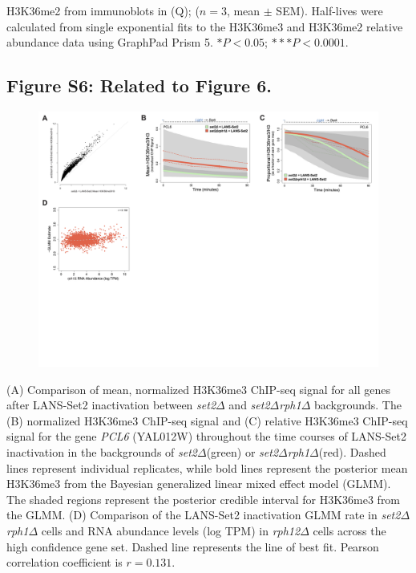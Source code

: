 \documentclass[11pt]{biorxiv}
\newcommand{\setdelt}{\emph{set2$\Delta$}\xspace}
\newcommand{\rphdelt}{\emph{rph12$\Delta$}\xspace}
\newcommand{\setdeltrphdelt}{\emph{set2$\Delta$rph1$\Delta$}\xspace}
\begin{document}
H3K36me2 from immunoblots in (Q); ($n = 3$, mean $\pm$ SEM). Half-lives were calculated from single exponential fits to the H3K36me3 and H3K36me2 relative abundance data using GraphPad Prism 5. $*P < 0.05$; $***P < 0.0001$.

\clearpage

\subsection{Figure S6: Related to Figure 6.}
\begin{figure}[ht!]
\center
\includegraphics[width=\textwidth, trim={0in 0in 0in 0in}, clip]{figures/FigS6.png}
\end{figure}
\vspace*{-1.5in}
\noindent (A) Comparison of mean, normalized H3K36me3 ChIP-seq signal for all genes after LANS-Set2 inactivation between \setdelt and \setdeltrphdelt backgrounds. The (B) normalized H3K36me3 ChIP-seq signal and (C) relative H3K36me3 ChIP-seq signal for the gene \emph{PCL6} (YAL012W) throughout the time courses of LANS-Set2 inactivation in the backgrounds of \setdelt (green) or \setdeltrphdelt (red). Dashed lines represent individual replicates, while bold lines represent the posterior mean H3K36me3 from the Bayesian generalized linear mixed effect model (GLMM). The shaded regions represent the posterior credible interval for H3K36me3 from the GLMM. (D) Comparison of the LANS-Set2 inactivation GLMM rate in \setdeltrphdelt cells and RNA abundance levels (log TPM) in \rphdelt cells across the high confidence gene set. Dashed line represents the line of best fit. Pearson correlation coefficient is $r=0.131$.
\end{document}
